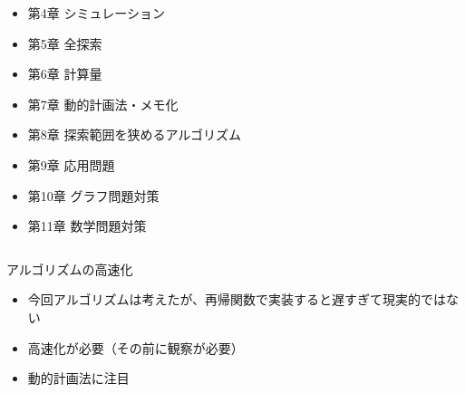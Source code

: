 \documentclass{beamer}
\begin{document}
\begin{frame}[fragile]{}{}
{\begin{columns}[T]
\begin{column}{0.3\textwidth}
\begin{itemize}
\item 第4章 シミュレーション
\item 第5章 全探索
\item 第6章 計算量
\item 第7章 動的計画法・メモ化
\item 第8章 探索範囲を狭めるアルゴリズム
\item 第9章 応用問題
\item 第10章 グラフ問題対策
\item 第11章 数学問題対策
\end{itemize}
\end{column}
\end{columns}
}
\end{frame}

\begin{frame}[fragile]{アルゴリズムの高速化}{}
\begin{itemize}\itemsep20pt
\item 今回アルゴリズムは考えたが、再帰関数で実装すると遅すぎて現実的ではない
\item 高速化が必要（その前に観察が必要）
\item 動的計画法に注目
\end{itemize}
\end{frame}
\end{document}
